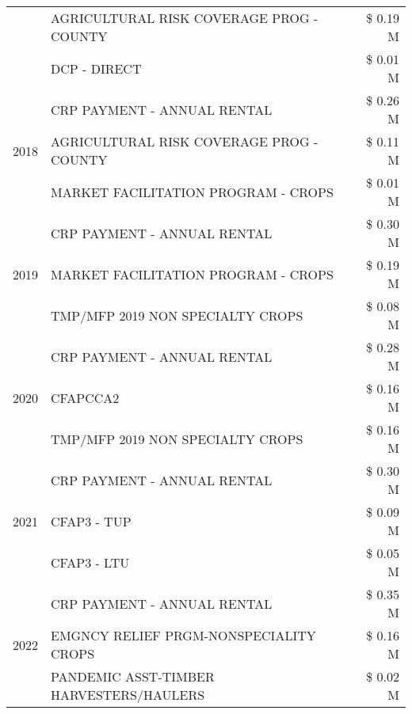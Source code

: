 \begin{tabular}{llr}
 & AGRICULTURAL RISK COVERAGE PROG - COUNTY & \$ 0.19 M \\
 & DCP - DIRECT & \$ 0.01 M \\
\cline{1-3}
\multirow[t]{3}{*}{2018} & CRP PAYMENT - ANNUAL RENTAL & \$ 0.26 M \\
 & AGRICULTURAL RISK COVERAGE PROG - COUNTY & \$ 0.11 M \\
 & MARKET FACILITATION PROGRAM - CROPS & \$ 0.01 M \\
\cline{1-3}
\multirow[t]{3}{*}{2019} & CRP PAYMENT - ANNUAL RENTAL & \$ 0.30 M \\
 & MARKET FACILITATION PROGRAM - CROPS & \$ 0.19 M \\
 & TMP/MFP 2019 NON SPECIALTY CROPS & \$ 0.08 M \\
\cline{1-3}
\multirow[t]{3}{*}{2020} & CRP PAYMENT - ANNUAL RENTAL & \$ 0.28 M \\
 & CFAPCCA2 & \$ 0.16 M \\
 & TMP/MFP 2019 NON SPECIALTY CROPS & \$ 0.16 M \\
\cline{1-3}
\multirow[t]{3}{*}{2021} & CRP PAYMENT - ANNUAL RENTAL & \$ 0.30 M \\
 & CFAP3 - TUP & \$ 0.09 M \\
 & CFAP3 - LTU & \$ 0.05 M \\
\cline{1-3}
\multirow[t]{3}{*}{2022} & CRP PAYMENT - ANNUAL RENTAL & \$ 0.35 M \\
 & EMGNCY RELIEF PRGM-NONSPECIALITY CROPS & \$ 0.16 M \\
 & PANDEMIC ASST-TIMBER HARVESTERS/HAULERS & \$ 0.02 M \\
\cline{1-3}
\bottomrule
\end{tabular}
